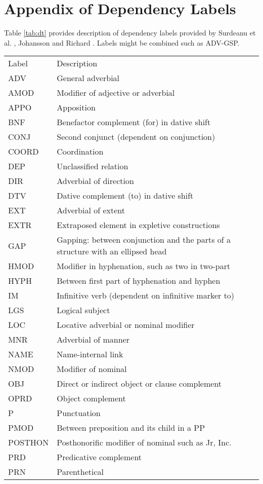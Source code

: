 \chapter{Appendix of Dependency Labels}
Table \ref{tab:dt} provides description of dependency labels provided by Surdeanu et al. \cite{surdeanu2008conll}, Johansson and Richard \cite{johansson2008dependency}. Labels might be combined such as ADV-GSP.
\begin{table}[H]
\centering
    \begin{tabular}{@{}l p{12cm} @{}} \toprule
    Label&Description \\
ADV& General adverbial\\
AMOD& Modifier of adjective or adverbial\\
APPO& Apposition\\
BNF&  Benefactor complement (for) in dative shift\\
CONJ& Second conjunct (dependent on conjunction)\\
COORD& Coordination\\
DEP& Unclassified relation\\
DIR&  Adverbial of direction\\
DTV&  Dative complement (to) in dative shift\\
EXT&  Adverbial of extent\\
EXTR& Extraposed element in expletive constructions\\
GAP& Gapping: between conjunction and the parts of a structure with an ellipsed head\\
HMOD& Modifier in hyphenation, such as two in two-part\\
HYPH& Between first part of hyphenation and hyphen\\
IM& Infinitive verb (dependent on infinitive marker to)\\
LGS& Logical subject\\
LOC& Locative adverbial or nominal modifier\\
MNR& Adverbial of manner\\
NAME& Name-internal link\\
NMOD& Modifier of nominal\\
OBJ& Direct or indirect object or clause complement\\
OPRD& Object complement\\
P& Punctuation\\
PMOD& Between preposition and its child in a PP\\
POSTHON&  Posthonorific modifier of nominal such as Jr, Inc.\\
PRD& Predicative complement\\
PRN& Parenthetical\\
 	\bottomrule 
    \end{tabular}  
\end{table}
